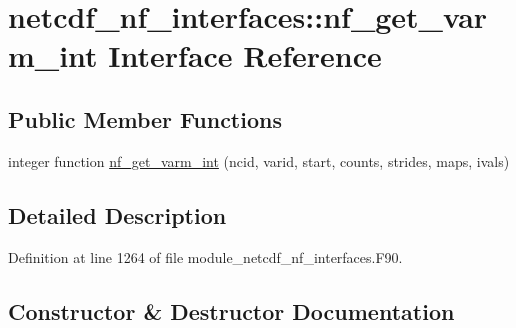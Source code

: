 \hypertarget{interfacenetcdf__nf__interfaces_1_1nf__get__varm__int}{}\section{netcdf\+\_\+nf\+\_\+interfaces\+:\+:nf\+\_\+get\+\_\+varm\+\_\+int Interface Reference}
\label{interfacenetcdf__nf__interfaces_1_1nf__get__varm__int}
\subsection*{Public Member Functions}
\begin{DoxyCompactItemize}
\item 
integer function \hyperlink{interfacenetcdf__nf__interfaces_1_1nf__get__varm__int_a0e46784c950e1ee8eab97159ad8b5ab3}{nf\+\_\+get\+\_\+varm\+\_\+int} (ncid, varid, start, counts, strides, maps, ivals)
\end{DoxyCompactItemize}


\subsection{Detailed Description}


Definition at line 1264 of file module\+\_\+netcdf\+\_\+nf\+\_\+interfaces.\+F90.



\subsection{Constructor \& Destructor Documentation}
\mbox{\label{interfacenetcdf__nf__interfaces_1_1nf__get__varm__int_a0e46784c950e1ee8eab97159ad8b5ab3}} 

